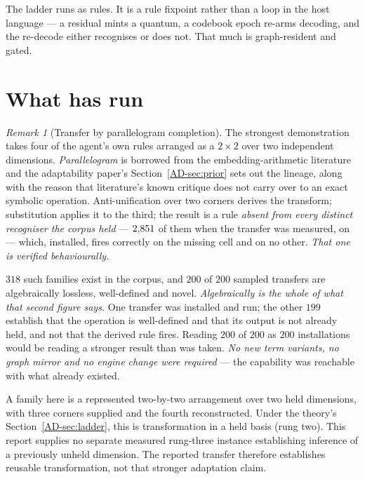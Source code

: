\documentclass[11pt,a4paper]{article}
\theoremstyle{remark}
\newtheorem{remark}[definition]{Remark}
\begin{document}
The ladder runs as rules. It is a rule fixpoint rather than a loop in the host language --- a residual
mints a quantum, a codebook epoch re-arms decoding, and the re-decode either recognises or does not.
That much is graph-resident and gated.

\section{What has run}\label{sec:run}
\begin{remark}[Transfer by parallelogram completion]\label{rem:parallelogram}
The strongest demonstration takes four of the agent's own rules arranged as a $2\times 2$ over two
independent dimensions. \emph{Parallelogram} is borrowed from the embedding-arithmetic literature and
the adaptability paper's Section~\ref{AD-sec:prior} sets out the lineage, along with the reason that
literature's known critique does not carry over to an exact symbolic operation. Anti-unification over
two corners derives the transform; substitution applies it to the third; the result is a rule
\emph{absent from every distinct recogniser the corpus held} --- $2{,}851$ of them when
the transfer was measured, on \recogniserRecordOn{} --- which, installed, fires correctly on the missing
cell and on no other. \emph{That one is verified behaviourally.}

$318$ such families exist in the corpus, and $200$ of $200$ sampled transfers are algebraically
lossless, well-defined and novel. \emph{Algebraically is the whole of what that second figure says.}
One transfer was installed and run; the other $199$ establish that the operation is well-defined and
that its output is not already held, and not that the derived rule fires. Reading $200$ of $200$ as
$200$ installations would be reading a stronger result than was taken. \emph{No new term variants, no
graph mirror and no engine change were required} --- the capability was reachable with what already
existed.
\end{remark}
A family here is a represented two-by-two arrangement over two held dimensions,
with three corners supplied and the fourth reconstructed. Under the theory's
Section~\ref{AD-sec:ladder}, this is transformation in a held basis (rung two).
This report supplies no separate measured rung-three instance establishing
inference of a previously unheld dimension. The reported transfer therefore
establishes reusable transformation, not that stronger adaptation claim.
\end{document}

